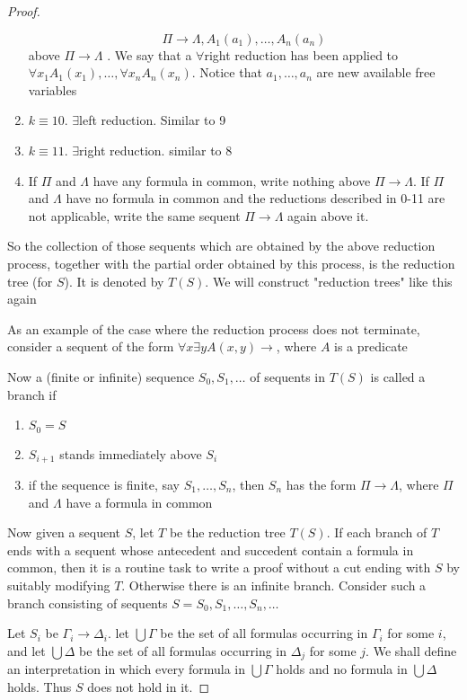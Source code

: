 \documentclass[11pt]{article}
\begin{document}
\begin{proof}
\begin{enumerate}
\begin{equation*}
\Pi\to\Lambda,A_1(a_1),\dots,A_n(a_n)
\end{equation*}
above \(\Pi\to\Lambda\) . We say that a \(\forall\)right reduction has been applied
to \(\forall x_1A_1(x_1),\dots,\forall x_nA_n(x_n)\). Notice that \(a_1,\dots,a_n\) are new available free variables
\item \(k\equiv10\). \(\exists\)left reduction. Similar to 9
\item \(k\equiv 11\). \(\exists\)right reduction. similar to 8
\item If \(\Pi\) and \(\Lambda\) have any formula in common, write nothing above \(\Pi\to\Lambda\). If \(\Pi\) and
\(\Lambda\) have no formula in common and the reductions described in 0-11 are not applicable, write
the same sequent \(\Pi\to\Lambda\) again above it.
\end{enumerate}


So the collection of those sequents which are obtained by the above reduction process, together
with the partial order obtained by this process, is the reduction tree (for \(S\)). It is denoted
by \(T(S)\). We will construct "reduction trees" like this again

As an example of the case where the reduction process does not terminate, consider a sequent of
the form \(\forall x\exists y A(x,y)\to\), where \(A\) is a predicate

Now a (finite or infinite) sequence \(S_0,S_1,\dots\) of sequents in \(T(S)\) is called a branch
if
\begin{enumerate}
\item \(S_0=S\)
\item \(S_{i+1}\) stands immediately above \(S_i\)
\item if the sequence is finite, say \(S_1,\dots,S_n\), then \(S_n\) has the form \(\Pi\to\Lambda\),
where \(\Pi\) and \(\Lambda\) have a formula in common
\end{enumerate}


Now given a sequent \(S\), let \(T\) be the reduction tree \(T(S)\). If each branch of \(T\) ends
with a sequent whose antecedent and succedent contain a formula in common, then it is a routine
task to write a proof without a cut ending with \(S\) by suitably modifying \(T\). Otherwise
there is an infinite branch. Consider such a branch consisting of sequents
\(S=S_0,S_1,\dots,S_n,\dots\)

Let \(S_i\) be \(\Gamma_i\to\Delta_i\). let \(\bigcup\Gamma\) be the set of all formulas
occurring in \(\Gamma_i\) for some \(i\), and let \(\bigcup\Delta\) be the set of all formulas
occurring in \(\Delta_j\) for some \(j\). We shall define an interpretation in which every
formula in \(\bigcup\Gamma\) holds and no formula in \(\bigcup\Delta\) holds. Thus \(S\) does not
hold in it.


\end{proof}
\end{document}
